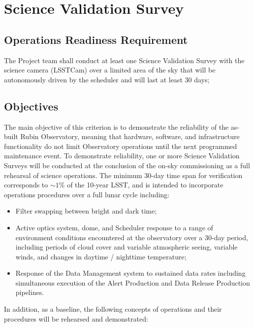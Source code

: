 \section{Science Validation Survey}  \label{sec:svs}

\subsection{Operations Readiness Requirement}

The Project team shall conduct at least one Science Validation Survey with the science camera (LSSTCam) over a limited area of the sky that will be autonomously driven by the scheduler and will last at least 30 days;

\subsection{Objectives}

The main objective of this criterion is to demonstrate the reliability of the as-built Rubin Observatory, meaning that hardware, software, and infrastructure functionality do not limit Observatory operations until the next programmed maintenance event.
To demonstrate reliability, one or more Science Validation Surveys will be conducted at the conclusion of the on-sky commissioning as a full rehearsal of science operations. The minimum 30-day time span for verification corresponds to $\sim 1\%$ of the 10-year LSST, and is intended to incorporate operations procedures over a full lunar cycle including:

\begin{itemize}
\item Filter swapping between bright and dark time;
\item Active optics system, dome, and Scheduler response to a range of environment conditions encountered at the observatory over a 30-day period, including periods of cloud cover and variable atmospheric seeing, variable winds, and changes in daytime / nighttime temperature;
\item Response of the Data Management system to sustained data rates including simultaneous execution of the Alert Production and Data Release Production pipelines.
\end{itemize}

In addition, as a baseline, the following concepts of operations and their procedures will be rehearsed and demonstrated:

